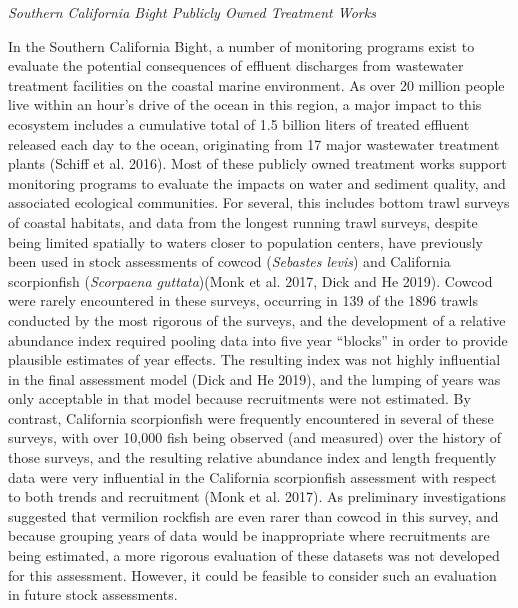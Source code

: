 \documentclass[11pt,
  english,
  a4paper,
]{article}
\begin{document}
\emph{Southern California Bight Publicly Owned Treatment Works}

In the Southern California Bight, a number of monitoring programs exist to evaluate the potential consequences of effluent discharges from wastewater treatment facilities on the coastal marine environment. As over 20 million people live within an hour's drive of the ocean in this region, a major impact to this ecosystem includes a cumulative total of 1.5 billion liters of treated effluent released each day to the ocean, originating from 17 major wastewater treatment plants {(Schiff et al. 2016)\leavevmode\tagmcend\tagstructend}. Most of these publicly owned treatment works support monitoring programs to evaluate the impacts on water and sediment quality, and associated ecological communities. For several, this includes bottom trawl surveys of coastal habitats, and data from the longest running trawl surveys, despite being limited spatially to waters closer to population centers, have previously been used in stock assessments of cowcod (\emph{Sebastes levis}) and California scorpionfish (\emph{Scorpaena guttata}){(Monk et al. 2017, Dick and He 2019)\leavevmode\tagmcend\tagstructend}. Cowcod were rarely encountered in these surveys, occurring in 139 of the 1896 trawls conducted by the most rigorous of the surveys, and the development of a relative abundance index required pooling data into five year ``blocks'' in order to provide plausible estimates of year effects. The resulting index was not highly influential in the final assessment model {(Dick and He 2019)\leavevmode\tagmcend\tagstructend}, and the lumping of years was only acceptable in that model because recruitments were not estimated. By contrast, California scorpionfish were frequently encountered in several of these surveys, with over 10,000 fish being observed (and measured) over the history of those surveys, and the resulting relative abundance index and length frequently data were very influential in the California scorpionfish assessment with respect to both trends and recruitment {(Monk et al. 2017)\leavevmode\tagmcend\tagstructend}. As preliminary investigations suggested that vermilion rockfish are even rarer than cowcod in this survey, and because grouping years of data would be inappropriate where recruitments are being estimated, a more rigorous evaluation of these datasets was not developed for this assessment. However, it could be feasible to consider such an evaluation in future stock assessments.
\end{document}
